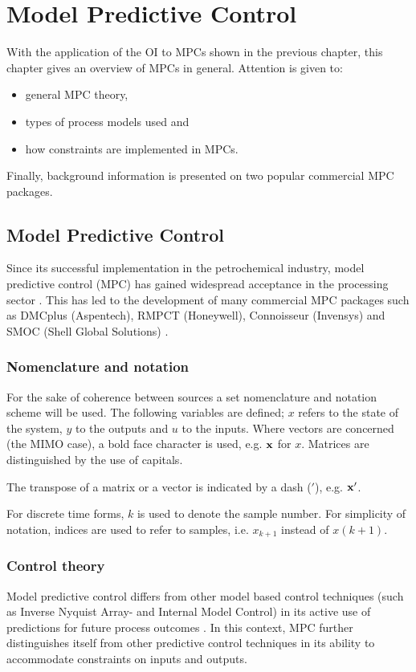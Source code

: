 \chapter{Model Predictive Control}\label{chap:background}
\begin{overview}
  With the application of the OI to MPCs shown in the previous chapter, this chapter gives an overview of MPCs in general.
Attention is given to:
\begin{itemize}
  \item general MPC theory,
  \item types of process models used and
  \item how constraints are implemented in MPCs.
\end{itemize}
Finally, background information is presented on two popular commercial MPC packages.
\end{overview}

\section{Model Predictive Control}\label{sec:mpclit}
Since its successful implementation in the petrochemical industry, model predictive control (MPC) has gained widespread acceptance in the processing sector \citep[1]{maciejowskimpc}. 
This has led to the development of many commercial MPC packages such as DMCplus (Aspentech), RMPCT (Honeywell), Connoisseur (Invensys) and SMOC (Shell Global Solutions) \citep{qinbadgwell}.
\subsection{Nomenclature and notation}
For the sake of coherence between sources a set nomenclature and notation scheme will be used. 
The following variables are defined; $x$ refers to the state of the system, $y$ to the outputs and $u$ to the inputs.
Where vectors are concerned (the MIMO case), a bold face character is used, e.g. ${\bf {x}}$ for $x$.
Matrices are distinguished by the use of capitals.

The transpose of a matrix or a vector is indicated by a dash ($'$), e.g. ${\bf {x}}'$.

For discrete time forms, $k$ is used to denote the sample number.
For simplicity of notation, indices are used to refer to samples, i.e. $x_{k+1}$ instead of $x(k+1)$.
\subsection{Control theory}
Model predictive control differs from other model based control techniques (such  as Inverse Nyquist Array- and Internal Model Control) in its active use of predictions for future process outcomes \citep[137]{maciejowskifb}. 
In this context, MPC further distinguishes itself from other predictive control techniques in its ability to accommodate constraints on inputs and outputs.

